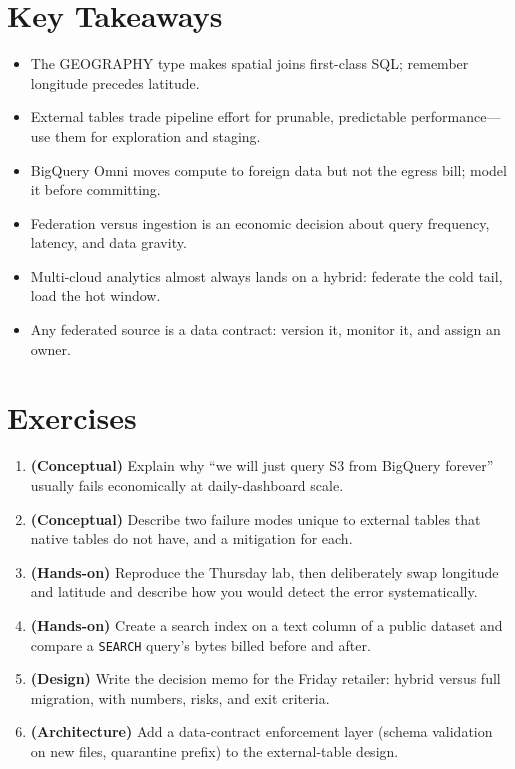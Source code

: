 \section*{Key Takeaways}
\begin{itemize}
    \item The GEOGRAPHY type makes spatial joins first-class SQL; remember longitude precedes latitude.
    \item External tables trade pipeline effort for prunable, predictable performance---use them for exploration and staging.
    \item BigQuery Omni moves compute to foreign data but not the egress bill; model it before committing.
    \item Federation versus ingestion is an economic decision about query frequency, latency, and data gravity.
    \item Multi-cloud analytics almost always lands on a hybrid: federate the cold tail, load the hot window.
    \item Any federated source is a data contract: version it, monitor it, and assign an owner.
\end{itemize}

\section{Exercises}
\begin{enumerate}
    \item \textbf{(Conceptual)} Explain why ``we will just query S3 from BigQuery forever'' usually fails economically at daily-dashboard scale.
    \item \textbf{(Conceptual)} Describe two failure modes unique to external tables that native tables do not have, and a mitigation for each.
    \item \textbf{(Hands-on)} Reproduce the Thursday lab, then deliberately swap longitude and latitude and describe how you would detect the error systematically.
    \item \textbf{(Hands-on)} Create a search index on a text column of a public dataset and compare a \texttt{SEARCH} query's bytes billed before and after.
    \item \textbf{(Design)} Write the decision memo for the Friday retailer: hybrid versus full migration, with numbers, risks, and exit criteria.
    \item \textbf{(Architecture)} Add a data-contract enforcement layer (schema validation on new files, quarantine prefix) to the external-table design.
\end{enumerate}
